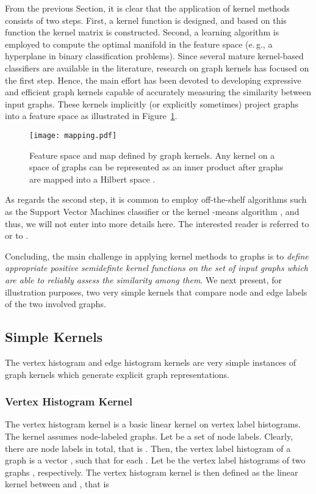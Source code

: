 \documentclass[twoside,11pt]{article}
\newcommand{\eg}{e.\,g., }
\begin{document}
From the previous Section, it is clear that the application of kernel methods consists of two steps.
First, a kernel function is designed, and based on this function the kernel matrix is constructed.
Second, a learning algorithm is employed to compute the optimal manifold in the feature space (\eg a hyperplane in binary classification problems).
Since several mature kernel-based classifiers are available in the literature, research on graph kernels has focused on the first step.
Hence, the main effort has been devoted to developing expressive and efficient graph kernels capable of accurately measuring the similarity between input graphs.
These kernels implicitly (or explicitly sometimes) project graphs into a feature space  as illustrated in Figure~\ref{fig:mapping}.
\begin{figure}
  \centering
  \texttt{[image: mapping.pdf]}
    \caption{Feature space and map defined by graph kernels.
    Any kernel on a space of graphs  can be represented as an inner product after graphs are mapped into a Hilbert space .}
    \label{fig:mapping}
\end{figure}
As regards the second step, it is common to employ off-the-shelf algorithms such as the Support Vector Machines classifier  or the kernel -means algorithm , and thus, we will not enter into more details here.
The interested reader is referred to  or to .

Concluding, the main challenge in applying kernel methods to graphs is  to \textit{define appropriate positive semidefinte kernel functions on the set of input graphs which are able to reliably assess the similarity among them}.
We next present, for illustration purposes, two very simple kernels that compare node and edge labels of the two involved graphs.

\subsection{Simple Kernels}
The vertex histogram and edge histogram kernels are very simple instances of graph kernels which generate explicit graph representations.

\subsubsection{Vertex Histogram Kernel}
The vertex histogram kernel is a basic linear kernel on vertex label histograms.
The kernel assumes node-labeled graphs.
Let  be a set of node labels.
Clearly, there are  node labels in total, that is .
Then, the vertex label histogram of a graph  is a vector , such that  for each .
Let  be the vertex label histograms of two graphs , respectively.
The vertex histogram kernel is then defined as the linear kernel between  and , that is
\end{document}
